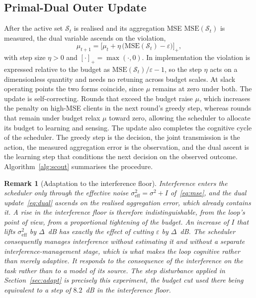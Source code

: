 \documentclass[lettersize,journal]{IEEEtran}
\newtheorem{remark}{Remark}
\newcommand{\calS}{\mathcal{S}}
\begin{document}
\subsection{Primal-Dual Outer Update}
After the active set $\calS_t$ is realised and its aggregation MSE $\mathrm{MSE}(\calS_t)$ is measured, the dual variable ascends on the violation,
\begin{equation}
\mu_{t+1}=\big[\mu_t+\eta\,\big(\mathrm{MSE}(\calS_t)-\varepsilon\big)\big]_+,
\label{eq:dual}
\end{equation}
with step size $\eta>0$ and $[\cdot]_+=\max(\cdot,0)$. In implementation the violation is expressed relative to the budget as $\mathrm{MSE}(\calS_t)/\varepsilon-1$, so the step $\eta$ acts on a dimensionless quantity and needs no retuning across budget scales. At slack operating points the two forms coincide, since $\mu$ remains at zero under both. The update is self-correcting. Rounds that exceed the budget raise $\mu$, which increases the penalty on high-MSE clients in the next round's greedy step, whereas rounds that remain under budget relax $\mu$ toward zero, allowing the scheduler to allocate its budget to learning and sensing. The update also completes the cognitive cycle of the scheduler. The greedy step is the decision, the joint transmission is the action, the measured aggregation error is the observation, and the dual ascent is the learning step that conditions the next decision on the observed outcome. Algorithm~\ref{alg:scout} summarises the procedure.

\begin{remark}[Adaptation to the interference floor]\label{rem:interf}
Interference enters the scheduler only through the effective noise $\sigma^{2}_{\mathrm{eff}}=\sigma^{2}+I$ of~\eqref{eq:mse}, and the dual update~\eqref{eq:dual} ascends on the \emph{realised} aggregation error, which already contains it. A rise in the interference floor is therefore indistinguishable, from the loop's point of view, from a proportional tightening of the budget. An increase of $I$ that lifts $\sigma^{2}_{\mathrm{eff}}$ by $\Delta$~dB has exactly the effect of cutting $\varepsilon$ by $\Delta$~dB. The scheduler consequently manages interference without estimating it and without a separate interference-management stage, which is what makes the loop cognitive rather than merely adaptive. It responds to the consequence of the interference on the task rather than to a model of its source. The step disturbance applied in Section~\ref{sec:adapt} is precisely this experiment, the budget cut used there being equivalent to a step of $8.2$~dB in the interference floor.%
\end{remark}
\end{document}
